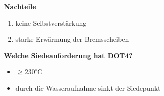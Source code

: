 \textbf{Nachteile}

\begin{enumerate}
\item
  keine Selbstverstärkung
\item
  starke Erwärmung der Bremsscheiben
\end{enumerate}

\textbf{Welche Siedeanforderung hat DOT4?}

\begin{itemize}
\item
  $\geq 230^\circ\text{C}$
\item
  durch die Wasseraufnahme sinkt der Siedepunkt
\end{itemize}
